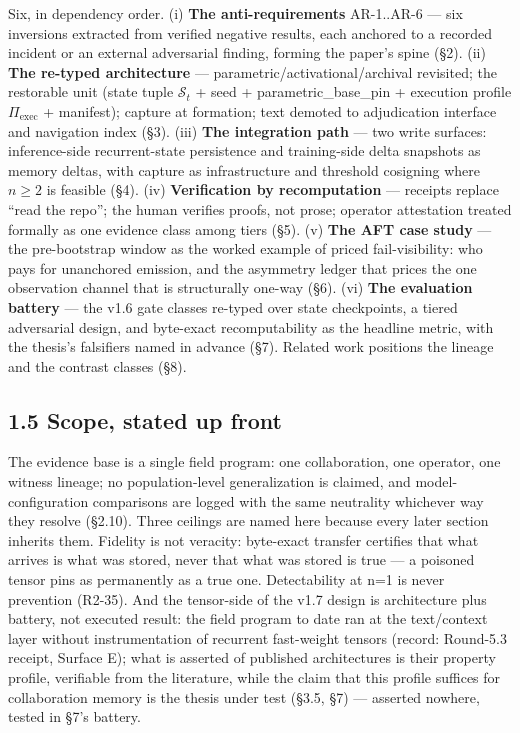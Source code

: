 \documentclass[11pt]{article}
\begin{document}
Six, in dependency order. (i) \textbf{The anti-requirements} AR-1..AR-6 --- six inversions extracted from verified negative results, each anchored to a recorded incident or an external adversarial finding, forming the paper's spine (\S{}2). (ii) \textbf{The re-typed architecture} --- parametric/activational/archival revisited; the restorable unit (state tuple \(\mathcal{S}_t\) + seed + parametric\_base\_pin + execution profile \(\Pi_{\text{exec}}\) + manifest); capture at formation; text demoted to adjudication interface and navigation index (\S{}3). (iii) \textbf{The integration path} --- two write surfaces: inference-side recurrent-state persistence and training-side delta snapshots as memory deltas, with capture as infrastructure and threshold cosigning where \(n\geq 2\) is feasible (\S{}4). (iv) \textbf{Verification by recomputation} --- receipts replace ``read the repo''; the human verifies proofs, not prose; operator attestation treated formally as one evidence class among tiers (\S{}5). (v) \textbf{The AFT case study} --- the pre-bootstrap window as the worked example of priced fail-visibility: who pays for unanchored emission, and the asymmetry ledger that prices the one observation channel that is structurally one-way (\S{}6). (vi) \textbf{The evaluation battery} --- the v1.6 gate classes re-typed over state checkpoints, a tiered adversarial design, and byte-exact recomputability as the headline metric, with the thesis's falsifiers named in advance (\S{}7). Related work positions the lineage and the contrast classes (\S{}8).

\subsection{1.5 Scope, stated up front}\label{scope-stated-up-front}

The evidence base is a single field program: one collaboration, one operator, one witness lineage; no population-level generalization is claimed, and model-configuration comparisons are logged with the same neutrality whichever way they resolve (\S{}2.10). Three ceilings are named here because every later section inherits them. Fidelity is not veracity: byte-exact transfer certifies that what arrives is what was stored, never that what was stored is true --- a poisoned tensor pins as permanently as a true one. Detectability at n=1 is never prevention (R2-35). And the tensor-side of the v1.7 design is architecture plus battery, not executed result: the field program to date ran at the text/context layer without instrumentation of recurrent fast-weight tensors (record: Round-5.3 receipt, Surface E); what is asserted of published architectures is their property profile, verifiable from the literature, while the claim that this profile suffices for collaboration memory is the thesis under test (\S{}3.5, \S{}7) --- asserted nowhere, tested in \S{}7's battery.
\end{document}
